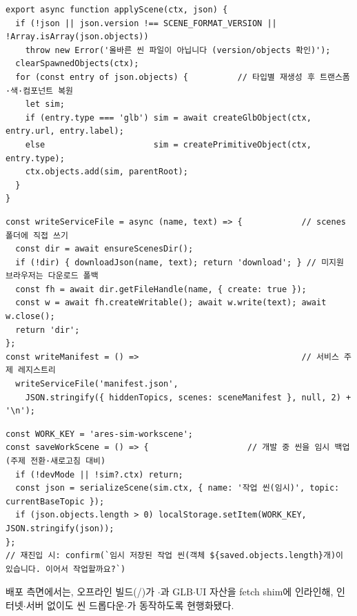 \begin{verbatim}
export async function applyScene(ctx, json) {
  if (!json || json.version !== SCENE_FORMAT_VERSION || !Array.isArray(json.objects))
    throw new Error('올바른 씬 파일이 아닙니다 (version/objects 확인)');
  clearSpawnedObjects(ctx);
  for (const entry of json.objects) {          // 타입별 재생성 후 트랜스폼·색·컴포넌트 복원
    let sim;
    if (entry.type === 'glb') sim = await createGlbObject(ctx, entry.url, entry.label);
    else                      sim = createPrimitiveObject(ctx, entry.type);
    ctx.objects.add(sim, parentRoot);
  }
}
\end{verbatim}

\begin{verbatim}
const writeServiceFile = async (name, text) => {            // scenes 폴더에 직접 쓰기
  const dir = await ensureScenesDir();
  if (!dir) { downloadJson(name, text); return 'download'; } // 미지원 브라우저는 다운로드 폴백
  const fh = await dir.getFileHandle(name, { create: true });
  const w = await fh.createWritable(); await w.write(text); await w.close();
  return 'dir';
};
const writeManifest = () =>                                 // 서비스 주제 레지스트리
  writeServiceFile('manifest.json',
    JSON.stringify({ hiddenTopics, scenes: sceneManifest }, null, 2) + '\n');
\end{verbatim}

\begin{verbatim}
const WORK_KEY = 'ares-sim-workscene';
const saveWorkScene = () => {                    // 개발 중 씬을 임시 백업(주제 전환·새로고침 대비)
  if (!devMode || !sim?.ctx) return;
  const json = serializeScene(sim.ctx, { name: '작업 씬(임시)', topic: currentBaseTopic });
  if (json.objects.length > 0) localStorage.setItem(WORK_KEY, JSON.stringify(json));
};
// 재진입 시: confirm(`임시 저장된 작업 씬(객체 ${saved.objects.length}개)이 있습니다. 이어서 작업할까요?`)
\end{verbatim}

\noindent 배포 측면에서는, 오프라인  빌드(/)가
$\cdot$과 GLB$\cdot$UI 자산을 fetch shim에 인라인해,
인터넷$\cdot$서버 없이도 씬 드롭다운$\cdot$가 동작하도록 현행화됐다.

